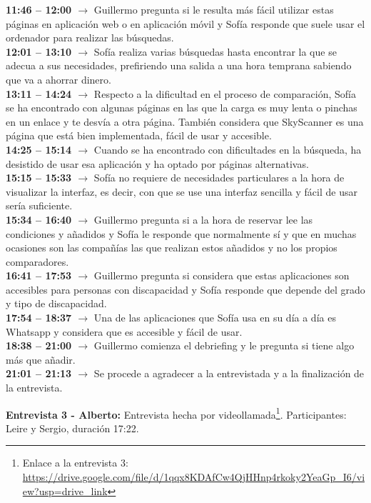 \textbf{11:46 -- 12:00 $\rightarrow$} Guillermo pregunta si le resulta más fácil utilizar estas páginas en aplicación web o en aplicación móvil y Sofía responde que suele usar el ordenador para realizar las búsquedas. \\
\textbf{12:01 -- 13:10 $\rightarrow$} Sofía realiza varias búsquedas hasta encontrar la que se adecua a sus necesidades, prefiriendo una salida a una hora temprana sabiendo que va a ahorrar dinero. \\
\textbf{13:11 -- 14:24 $\rightarrow$} Respecto a la dificultad en el proceso de comparación, Sofía se ha encontrado con algunas páginas en las que la carga es muy lenta o pinchas en un enlace y te desvía a otra página. También considera que SkyScanner es una página que está bien implementada, fácil de usar y accesible. \\
\textbf{14:25 -- 15:14 $\rightarrow$} Cuando se ha encontrado con dificultades en la búsqueda, ha desistido de usar esa aplicación y ha optado por páginas alternativas. \\
\textbf{15:15 -- 15:33 $\rightarrow$} Sofía no requiere de necesidades particulares a la hora de visualizar la interfaz, es decir, con que se use una interfaz sencilla y fácil de usar sería suficiente. \\
\textbf{15:34 -- 16:40 $\rightarrow$} Guillermo pregunta si a la hora de reservar lee las condiciones y añadidos y Sofía le responde que normalmente sí y que en muchas ocasiones son las compañías las que realizan estos añadidos y no los propios comparadores. \\
\textbf{16:41 -- 17:53 $\rightarrow$} Guillermo pregunta si considera que estas aplicaciones son accesibles para personas con discapacidad y Sofía responde que depende del grado y tipo de discapacidad. \\
\textbf{17:54 -- 18:37 $\rightarrow$} Una de las aplicaciones que Sofía usa en su día a día es Whatsapp y considera que es accesible y fácil de usar. \\
\textbf{18:38 -- 21:00 $\rightarrow$} Guillermo comienza el debriefing y le pregunta si tiene algo más que añadir. \\
\textbf{21:01 -- 21:13 $\rightarrow$} Se procede a agradecer a la entrevistada y a la finalización de la entrevista.

\textbf{Entrevista 3 - Alberto:} Entrevista hecha por videollamada\footnote{Enlace a la entrevista 3: \url{https://drive.google.com/file/d/1qqx8KDAfCw4QjHHnp4rkoky2YeaGp_I6/view?usp=drive_link}}. Participantes: Leire y Sergio, duración 17:22.

